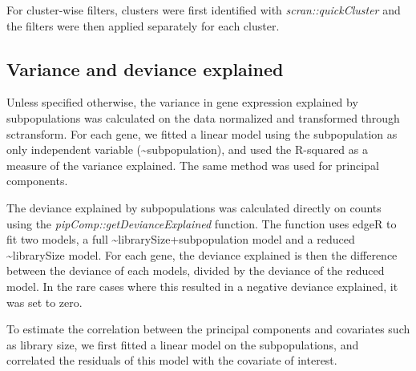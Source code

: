 \documentclass{bmcart}
\begin{document}
For cluster-wise filters, clusters were first identified with \textit{scran::quickCluster} and the filters were then applied separately for each cluster.


\subsection*{Variance and deviance explained}

Unless specified otherwise, the variance in gene expression explained by subpopulations was calculated on the data normalized and transformed through sctransform. For each gene, we fitted a linear model using the subpopulation as only independent variable (\textasciitilde subpopulation), and used the R-squared as a measure of the variance explained. The same method was used for principal components.

The deviance explained by subpopulations was calculated directly on counts using the \textit{pipComp::getDevianceExplained} function. The function uses edgeR to fit two models, a full \textasciitilde librarySize+subpopulation model and a reduced \textasciitilde librarySize model. For each gene, the deviance explained is then the difference between the deviance of each models, divided by the deviance of the reduced model. In the rare cases where this resulted in a negative deviance explained, it was set to zero.

To estimate the correlation between the principal components and covariates such as library size, we first fitted a linear model on the subpopulations, and correlated the residuals of this model with the covariate of interest.


\end{document}
